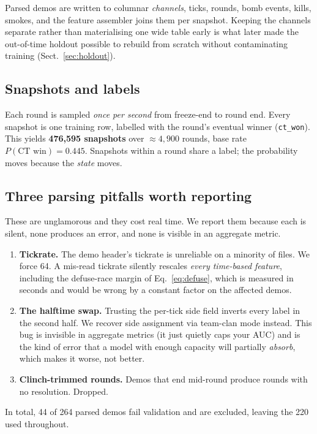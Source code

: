 \documentclass[11pt,a4paper]{article}
\begin{document}
Parsed demos are written to columnar \emph{channels}, ticks, rounds, bomb events,
kills, smokes, and the feature assembler joins them per snapshot. Keeping the channels
separate rather than materialising one wide table early is what later made the
out-of-time holdout possible to rebuild from scratch without contaminating training
(Sect.~\ref{sec:holdout}).

\subsection{Snapshots and labels}
Each round is sampled \emph{once per second} from freeze-end to round end. Every snapshot
is one training row, labelled with the round's eventual winner (\texttt{ct\_won}). This
yields \textbf{476{,}595 snapshots} over $\approx 4{,}900$ rounds, base rate
$P(\text{CT win}) = 0.445$. Snapshots within a round share a label; the probability moves
because the \emph{state} moves.

\subsection{Three parsing pitfalls worth reporting}
\label{sec:pitfalls}

These are unglamorous and they cost real time. We report them because each is silent, none produces an error, and none is visible in an aggregate metric.

\begin{enumerate}
  \item \textbf{Tickrate.} The demo header's tickrate is unreliable on a minority of
    files. We force 64. A mis-read tickrate silently rescales \emph{every time-based
    feature}, including the defuse-race margin of Eq.~\ref{eq:defuse}, which is measured
    in seconds and would be wrong by a constant factor on the affected demos.
  \item \textbf{The halftime swap.} Trusting the per-tick side field inverts every label
    in the second half. We recover side assignment via team-clan mode instead. This bug
    is invisible in aggregate metrics (it just quietly caps your AUC) and is the kind
    of error that a model with enough capacity will partially \emph{absorb}, which makes
    it worse, not better.
  \item \textbf{Clinch-trimmed rounds.} Demos that end mid-round produce rounds with no
    resolution. Dropped.
\end{enumerate}

In total, 44 of 264 parsed demos fail validation and are excluded, leaving the 220 used
throughout.
\end{document}
